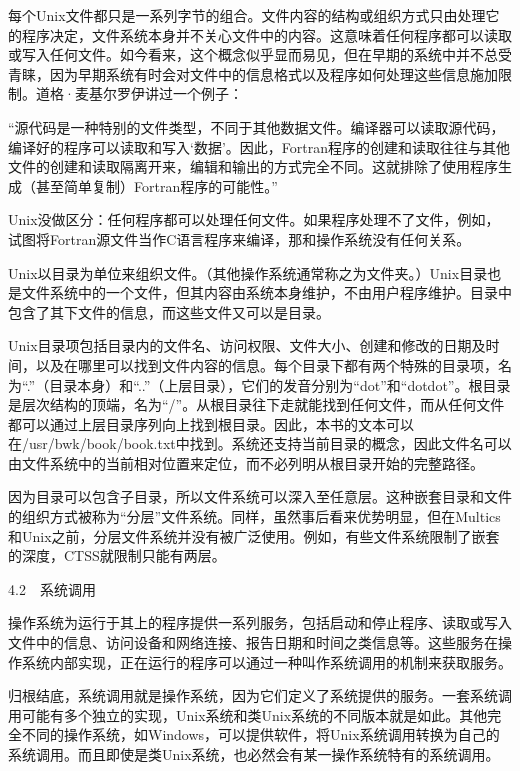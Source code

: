 \documentclass[a4paper,12pt,UTF8,twoside]{ctexbook}
\begin{document}
{每个Unix文件都只是一系列字节的组合。文件内容的结构或组织方式只由处理它的程序决定，文件系统本身并不关心文件中的内容。这意味着任何程序都可以读取或写入任何文件。如今看来，这个概念似乎显而易见，但在早期的系统中并不总受青睐，因为早期系统有时会对文件中的信息格式以及程序如何处理这些信息施加限制。道格·麦基尔罗伊讲过一个例子：

“源代码是一种特别的文件类型，不同于其他数据文件。编译器可以读取源代码，编译好的程序可以读取和写入‘数据’。因此，Fortran程序的创建和读取往往与其他文件的创建和读取隔离开来，编辑和输出的方式完全不同。这就排除了使用程序生成（甚至简单复制）Fortran程序的可能性。”



Unix没做区分：任何程序都可以处理任何文件。如果程序处理不了文件，例如，试图将Fortran源文件当作C语言程序来编译，那和操作系统没有任何关系。

Unix以目录为单位来组织文件。（其他操作系统通常称之为文件夹。）Unix目录也是文件系统中的一个文件，但其内容由系统本身维护，不由用户程序维护。目录中包含了其下文件的信息，而这些文件又可以是目录。

Unix目录项包括目录内的文件名、访问权限、文件大小、创建和修改的日期及时间，以及在哪里可以找到文件内容的信息。每个目录下都有两个特殊的目录项，名为“.”（目录本身）和“..”（上层目录），它们的发音分别为“dot”和“dotdot”。根目录是层次结构的顶端，名为“/”。从根目录往下走就能找到任何文件，而从任何文件都可以通过上层目录序列向上找到根目录。因此，本书的文本可以在/usr/bwk/book/book.txt中找到。系统还支持当前目录的概念，因此文件名可以由文件系统中的当前相对位置来定位，而不必列明从根目录开始的完整路径。

因为目录可以包含子目录，所以文件系统可以深入至任意层。这种嵌套目录和文件的组织方式被称为“分层”文件系统。同样，虽然事后看来优势明显，但在Multics和Unix之前，分层文件系统并没有被广泛使用。例如，有些文件系统限制了嵌套的深度，CTSS就限制只能有两层。





4.2　系统调用


操作系统为运行于其上的程序提供一系列服务，包括启动和停止程序、读取或写入文件中的信息、访问设备和网络连接、报告日期和时间之类信息等。这些服务在操作系统内部实现，正在运行的程序可以通过一种叫作系统调用的机制来获取服务。

归根结底，系统调用就是操作系统，因为它们定义了系统提供的服务。一套系统调用可能有多个独立的实现，Unix系统和类Unix系统的不同版本就是如此。其他完全不同的操作系统，如Windows，可以提供软件，将Unix系统调用转换为自己的系统调用。而且即使是类Unix系统，也必然会有某一操作系统特有的系统调用。

}
\end{document}
